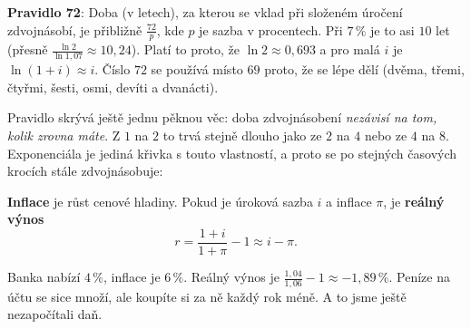 \begin{note}
  \textbf{Pravidlo 72}: Doba (v letech), za kterou se vklad při složeném úročení zdvojnásobí, je přibližně $\frac{72}{p}$, kde $p$ je sazba v procentech. Při $7\,\%$ je to asi $10$ let (přesně $\frac{\ln 2}{\ln 1{,}07}\approx 10{,}24$). Platí to proto, že $\ln 2\approx 0{,}693$ a pro malá $i$ je $\ln(1 + i)\approx i$. Číslo $72$ se používá místo $69$ proto, že se lépe dělí (dvěma, třemi, čtyřmi, šesti, osmi, devíti a dvanácti).


  Pravidlo skrývá ještě jednu pěknou věc: doba zdvojnásobení \textit{nezávisí na tom, kolik zrovna máte}. Z $1$ na $2$ to trvá stejně dlouho jako ze $2$ na $4$ nebo ze $4$ na $8$. Exponenciála je jediná křivka s touto vlastností, a proto se po stejných časových krocích stále zdvojnásobuje:
  \begin{center}
  \end{center}
\end{note}

\begin{definitionbox}
  \textbf{Inflace} je růst cenové hladiny. Pokud je úroková sazba $i$ a inflace $\pi$, je \textbf{reálný výnos}
  \begin{equation*}
    r = \frac{1 + i}{1 + \pi} - 1\approx i - \pi.
  \end{equation*}
\end{definitionbox}

\begin{example}
  Banka nabízí $4\,\%$, inflace je $6\,\%$. Reálný výnos je $\frac{1{,}04}{1{,}06} - 1\approx -1{,}89\,\%$. Peníze na účtu se sice množí, ale koupíte si za ně každý rok méně. A to jsme ještě nezapočítali daň.
\end{example}

